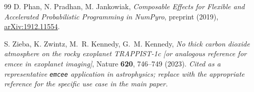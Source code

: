 \documentclass{article}
\begin{document}
\begin{thebibliography}{99}
D. Phan, N. Pradhan, M. Jankowiak,
\textit{Composable Effects for Flexible and Accelerated Probabilistic
Programming in NumPyro},
preprint (2019),
\href{https://arxiv.org/abs/1912.11554}{arXiv:1912.11554}.

S. Zieba, K. Zwintz, M.~R. Kennedy, G.~M. Kennedy,
\textit{No thick carbon dioxide atmosphere on the rocky exoplanet TRAPPIST-1c
[\textnormal{or analogous reference for emcee in exoplanet imaging}]},
Nature \textbf{620}, 746--749 (2023). \emph{Cited as a representative
\texttt{emcee} application in astrophysics; replace with the appropriate
reference for the specific use case in the main paper.}

\end{thebibliography}
\end{document}
